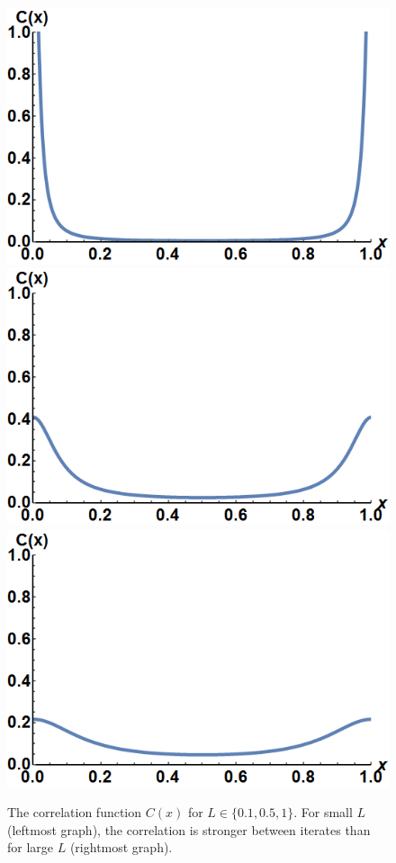 \begin{figure}[htp]
\caption[The correlation function $C(x)$]{The correlation function
  $C(x)$ for $L \in \{0.1,0.5,1\}$. For small $L$
  (leftmost graph), the correlation is stronger between iterates than for large $L$
  (rightmost graph).}\label{fig:correlation}
\centering
\includegraphics[width=.3\textwidth]{figs/correlation_L01.png}\hfill
\includegraphics[width=.3\textwidth]{figs/correlation_L05.png}\hfill
\includegraphics[width=.3\textwidth]{figs/correlation_L1.png}
\end{figure}

